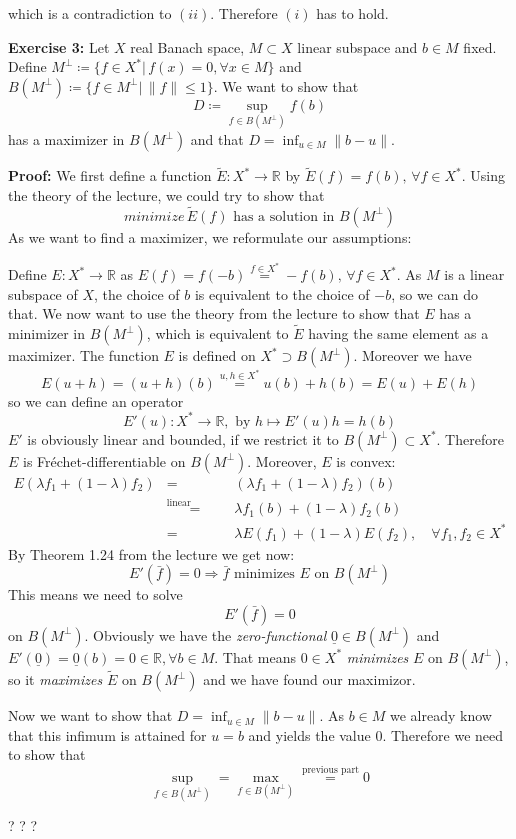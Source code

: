 \documentclass[a4paper]{amsart}
\begin{document}
	which is a contradiction to $(ii)$. Therefore $(i)$ has to hold.\par\par


	\textbf{Exercise 3: } Let $X$ real Banach space, $M\subset X$ linear subspace and $b\in M$ fixed. Define $M^\perp \coloneqq\{f\in X^*\vert\, f(x) = 0,\forall x\in M\}$ and $B(M^\perp) \coloneqq \{ f\in M^\perp\vert\, \|f\| \leq 1\}$. We want to show that
	\[
		D\coloneqq \sup_{f\in B(M^\perp)} f(b)
	\]
	has a maximizer in $B(M^\perp)$ and that $D=\inf_{u\in M}\|b-u\|$.\par
	\textbf{Proof: } We first define a function $\tilde{E}: X^*\to\mathbb{R}$ by $\tilde{E}(f) = f(b),\,\forall f\in X^*$. Using the theory of the lecture, we could try to show that 
	\[
		minimize\,\tilde{E}(f) \text{ has a solution in } B(M^\perp) 
	\]
	As we want to find a maximizer, we reformulate our assumptions: \par
	Define $E:X^*\to\mathbb{R}$ as $E(f) = f(-b) \overset{f\in X^*}= -f(b),\,\forall f\in X^*$. As $M$ is a linear subspace of $X$, the choice of $b$ is equivalent to the choice of $-b$, so we can do that. We now want to use the theory from the lecture to show that $E$ has a minimizer in $B(M^\perp)$, which is equivalent to $\tilde{E}$ having the same element as a maximizer. The function $E$ is defined on $X^*\supset B(M^\perp)$. Moreover we have
	\[
		E(u+h) = (u+h)(b) \overset{u,h\in X^*}= u(b)+h(b) = E(u)+E(h)
	\]
	so we can define an operator
	\[
		E'(u): X^*\to\mathbb{R},\text{ by } h \mapsto E'(u)h = h(b)
	\]
	$E'$ is obviously linear and bounded, if we restrict it to $B(M^\perp)\subset X^*$. Therefore $E$ is Fréchet-differentiable on $B(M^\perp)$.
	Moreover, $E$ is convex:
	\begin{eqnarray*}
		E(\lambda f_1 + (1-\lambda)f_2) &=& (\lambda f_1 + (1-\lambda)f_2)(b) \\
		&\overset{\text{linear functionals}}=& \lambda f_1(b) + (1-\lambda)f_2(b)\\
		&=& \lambda E(f_1) + (1-\lambda)E(f_2),\quad\forall f_1,f_2\in X^*
	\end{eqnarray*}
	By Theorem 1.24 from the lecture we get now:
	\[
		E'(\bar{f}) = 0 \Longrightarrow \bar{f} \text{ minimizes }E \text{ on }B(M^\perp)
	\]
	This means we need to solve
	\[
		E'(\bar{f}) = 0
	\]
	on $B(M^\perp)$. Obviously we have the \emph{zero-functional} $\underline{0}\in B(M^\perp)$ and $E'(\underline{0}) = \underline{0}(b) = 0\in\mathbb{R}, \forall b\in M$. That means $0\in X^*$ \emph{minimizes} $E$ on $B(M^\perp)$, so it \emph{maximizes} $\tilde{E}$ on $B(M^\perp)$ and we have found our maximizor.\par
	Now we want to show that $D = \inf_{u\in M} \|b-u\|$. As $b\in M$ we already know that this infimum is attained for $u = b$ and yields the value $0$. Therefore we need to show that 
	\[
		\sup_{f\in B(M^\perp)} = \max_{f\in B(M^\perp)} \overset{\text{previous part}}= 0
	\]

	? ? ?
\end{document}
